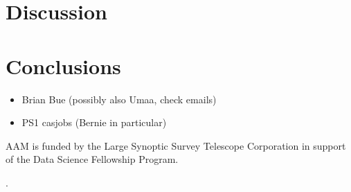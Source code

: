 \documentclass[twocolumn]{aastex62}
\begin{document}
\section{Discussion}

\section{Conclusions}

\acknowledgements

\begin{itemize}
    \item Brian Bue (possibly also Umaa, check emails)
    \item PS1 casjobs (Bernie in particular)
\end{itemize}

AAM is funded by the Large Synoptic Survey Telescope Corporation in support of
the Data Science Fellowship Program.


.


\appendix




\end{document}
